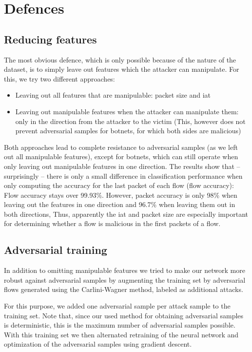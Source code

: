 \documentclass[conference]{IEEEtran}
\begin{document}
\section{Defences}

\subsection{Reducing features}
The most obvious defence, which is only possible because of the nature of the dataset, is to simply leave out features which the attacker can manipulate. For this, we try two different approaches:
\begin{itemize}[topsep=0pt,wide,labelwidth=!,labelindent=0pt]
\item Leaving out all features that are manipulable: packet size and \gls{iat}
\item Leaving out manipulable features when the attacker can manipulate them: only in the direction from the attacker to the victim (This, however does not prevent adversarial samples for botnets, for which both sides are malicious)
\end{itemize}

Both approaches lead to complete resistance to adversarial samples (as we left out all manipulable features), except for botnets, which can still operate when only leaving out manipulable features in one direction. The results show that -- surprisingly -- there is only a small difference in classification performance when only computing the accuracy for the last packet of each flow (flow accuracy): Flow accuracy stays over 99.93\%. However, packet accuracy is only 98\% when leaving out the features in one direction and 96.7\% when leaving them out in both directions, Thus, apparently the \gls{iat} and packet size are especially important for determining whether a flow is malicious in the first packets of a flow.

\subsection{Adversarial training}
In addition to omitting manipulable features we tried to make our network more robust against adversarial samples by augmenting the training set by adversarial flows generated using the Carlini-Wagner method, labeled as additional attacks.

For this purpose, we added one adversarial sample per attack sample to the training set. Note that, since our used method for obtaining adversarial samples is deterministic, this is the maximum number of adversarial samples possible. With this training set we then alternated retraining of the neural network and optimization of the adversarial samples using gradient descent.
\end{document}
